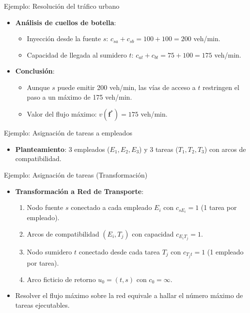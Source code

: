 \documentclass[
  ignorenonframetext,
]{beamer}
\providecommand{\tightlist}{%
  \setlength{\itemsep}{0pt}\setlength{\parskip}{0pt}}
\begin{document}
\begin{frame}{Ejemplo: Resolución del tráfico urbano}
\label{ejemplo-resoluciuxf3n-del-truxe1fico-urbano}
\begin{itemize}
\tightlist
\item
  \textbf{Análisis de cuellos de botella}:

  \begin{itemize}
  \tightlist
  \item
    Inyección desde la fuente \(s\):
    \(c_{sa} + c_{sb} = 100 + 100 = 200\) veh/min.
  \item
    Capacidad de llegada al sumidero \(t\):
    \(c_{at} + c_{bt} = 75 + 100 = 175\) veh/min.
  \end{itemize}
\item
  \textbf{Conclusión}:

  \begin{itemize}
  \tightlist
  \item
    Aunque \(s\) puede emitir 200 veh/min, las vías de acceso a \(t\)
    restringen el paso a un máximo de 175 veh/min.
  \item
    Valor del flujo máximo: \(v(\mathbf{f}^*) = 175\) veh/min.
  \end{itemize}
\end{itemize}
\end{frame}

\begin{frame}{Ejemplo: Asignación de tareas a empleados}
\label{ejemplo-asignaciuxf3n-de-tareas-a-empleados}
\begin{itemize}
\tightlist
\item
  \textbf{Planteamiento}: 3 empleados (\(E_1, E_2, E_3\)) y 3 tareas
  (\(T_1, T_2, T_3\)) con arcos de compatibilidad.
\end{itemize}
\end{frame}

\begin{frame}{Ejemplo: Asignación de tareas (Transformación)}
\label{ejemplo-asignaciuxf3n-de-tareas-transformaciuxf3n}
\begin{itemize}
\tightlist
\item
  \textbf{Transformación a Red de Transporte}:

  \begin{enumerate}
  \tightlist
  \item
    Nodo fuente \(s\) conectado a cada empleado \(E_i\) con
    \(c_{s E_i} = 1\) (1 tarea por empleado).
  \item
    Arcos de compatibilidad \((E_i, T_j)\) con capacidad
    \(c_{E_i T_j} = 1\).
  \item
    Nodo sumidero \(t\) conectado desde cada tarea \(T_j\) con
    \(c_{T_j t} = 1\) (1 empleado por tarea).
  \item
    Arco ficticio de retorno \(u_0 = (t, s)\) con \(c_0 = \infty\).
  \end{enumerate}
\item
  Resolver el flujo máximo sobre la red equivale a hallar el número
  máximo de tareas ejecutables.
\end{itemize}
\end{frame}
\end{document}
